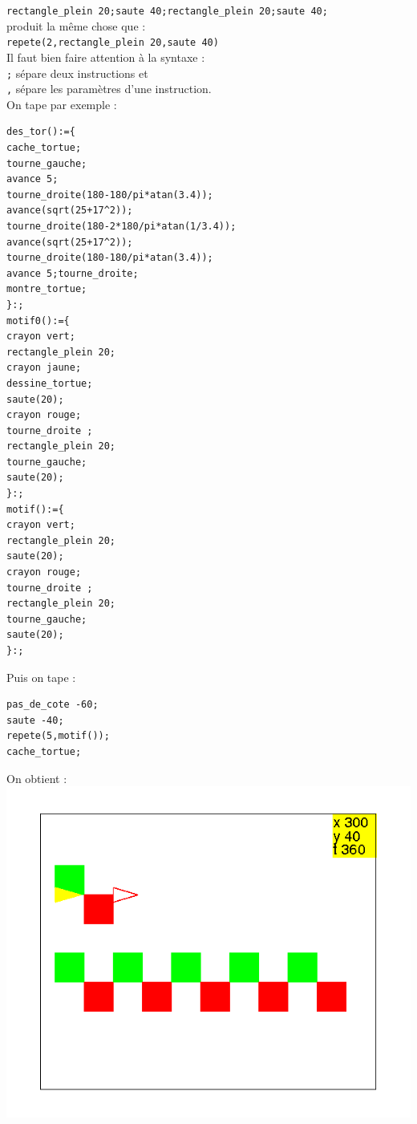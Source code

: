 \documentclass[a4paper,11pt]{book}
\begin{document}
{\tt rectangle\_plein 20;saute 40;rectangle\_plein 20;saute 40;}\\
produit la m\^eme chose que :\\
{\tt repete(2,rectangle\_plein 20,saute 40)}\\
Il faut bien faire attention \`a la syntaxe :\\
{\tt ;} s\'epare deux instructions et\\
{\tt ,} s\'epare les param\`etres d'une instruction.\\
On tape par exemple :
\begin{verbatim}
des_tor():={
cache_tortue;
tourne_gauche;
avance 5;
tourne_droite(180-180/pi*atan(3.4));
avance(sqrt(25+17^2));
tourne_droite(180-2*180/pi*atan(1/3.4));
avance(sqrt(25+17^2));
tourne_droite(180-180/pi*atan(3.4));
avance 5;tourne_droite;
montre_tortue;
}:;
motif0():={
crayon vert;
rectangle_plein 20;
crayon jaune;
dessine_tortue;
saute(20);
crayon rouge;
tourne_droite ;
rectangle_plein 20;
tourne_gauche;
saute(20);
}:;
motif():={
crayon vert;
rectangle_plein 20;
saute(20);
crayon rouge;
tourne_droite ;
rectangle_plein 20;
tourne_gauche;
saute(20);
}:;
\end{verbatim}
Puis on tape :
\begin{verbatim}
pas_de_cote -60;
saute -40;
repete(5,motif());
cache_tortue;
\end{verbatim}
On obtient :\\
\includegraphics[width=\textwidth]{tortfrise}
\end{document}
